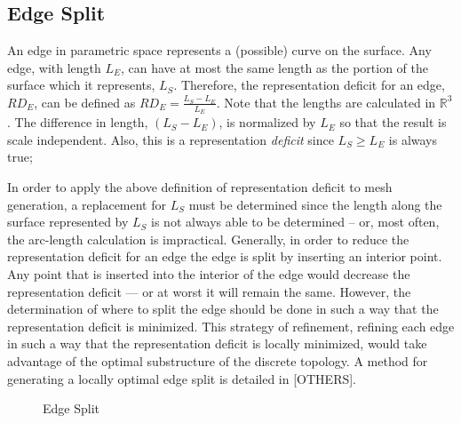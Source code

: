 \subsection{Edge Split}
An edge in parametric space represents a (possible) curve on the
surface. Any edge, with length $L_E$, can have at most the same length
as the portion of the surface which it represents, $L_S$. Therefore, the
representation deficit for an edge, $RD_E$, can be defined as $RD_E =
\frac{L_S - L_E}{L_E}$. Note that the lengths are calculated in
${\mathbb R}^3$. The difference in length, $\left(L_S - L_E\right)$, is
normalized by $L_E$ so that the result is scale independent. Also, this
is a representation {\it deficit} since $L_S \ge L_E$ is always true;

In order to apply the above definition of representation deficit to mesh
generation, a replacement for $L_S$ must be determined since the length
along the surface represented by $L_S$ is not always able to be
determined -- or, most often, the arc-length calculation is impractical.
Generally, in order to reduce the representation deficit for an edge the
edge is split by inserting an interior point. Any point that is inserted
into the interior of the edge would decrease the representation deficit
--- or at worst it will remain the same. However, the determination of
where to split the edge should be done in such a way that the
representation deficit is minimized. This strategy of refinement,
refining each edge in such a way that the representation deficit is
locally minimized, would take advantage of the optimal substructure of
the discrete topology. A method for generating a locally optimal edge
split is detailed in \cite{mclaurin12,mclaurin13}[OTHERS].

\begin{figure}[h!]
  \caption{Edge Split}
\end{figure}

